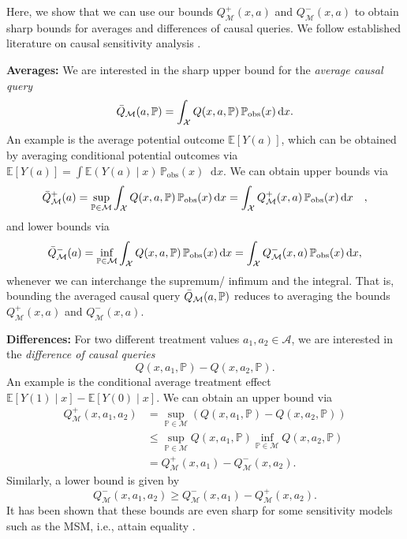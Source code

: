 \documentclass{article} %
\newcommand{\E}{\mathbb{E}}
\newcommand*\diff{\mathop{}\!\mathrm{d}}
\theoremstyle{definition}
\theoremstyle{plain}
\begin{document}
Here, we show that we can use our bounds $Q^+_\mathcal{M}(x, a)$ and $Q^-_\mathcal{M}(x, a)$ to obtain sharp bounds for averages and differences of causal queries. We follow established literature on causal sensitivity analysis \citep{Dorn.2022, Dorn.2022b, Frauen.2023c}.

\textbf{Averages:} We are interested in the sharp upper bound for the \emph{average causal query}
\begin{equation}
\Bar{Q}_\mathcal{M}(a, \mathbb{P}) = \int_\mathcal{X} Q(x, a, \mathbb{P}) \, \mathbb{P}_\mathrm{obs}(x) \diff x.
\end{equation}
An example is the average potential outcome $\E[Y(a)]$, which can be obtained by averaging conditional potential outcomes via $\E[Y(a)] = \int \E(Y(a) \mid x) \, \mathbb{P}_\mathrm{obs}(x) \diff x$. We can obtain upper bounds via
\begin{equation}\label{eq:bounds_avg}
\Bar{Q}^+_\mathcal{M}(a) = \sup_{\mathbb{P} \in \mathcal{M}} \int_\mathcal{X} Q(x, a, \mathbb{P}) \, \mathbb{P}_\mathrm{obs}(x) \diff x = \int_\mathcal{X} Q^+_\mathcal{M}(x, a) \, \mathbb{P}_\mathrm{obs}(x) \diff x\quad,
\end{equation}
and lower bounds via
\begin{equation}
 \Bar{Q}^-_\mathcal{M}(a) = \inf_{\mathbb{P} \in \mathcal{M}} \int_\mathcal{X} Q(x, a, \mathbb{P}) \, \mathbb{P}_\mathrm{obs}(x) \diff x  =  \int_\mathcal{X} Q^-_\mathcal{M}(x, a) \, \mathbb{P}_\mathrm{obs}(x) \diff x,
\end{equation}
whenever we can interchange the supremum/ infimum and the integral. That is, bounding the averaged causal query $\Bar{Q}_\mathcal{M}(a, \mathbb{P})$ reduces to averaging the bounds $Q^+_\mathcal{M}(x, a)$ and $Q^-_\mathcal{M}(x, a)$.

\textbf{Differences:} For two different treatment values $a_1, a_2 \in \mathcal{A}$, we are interested in the \emph{difference of causal queries}
\begin{equation}
    Q(x, a_1, \mathbb{P}) - Q(x, a_2, \mathbb{P}).
\end{equation}
An example is the conditional average treatment effect $\E[Y(1) \mid x] - \E[Y(0) \mid x]$. We can obtain an upper bound via
\begin{align}\label{eq:bounds_diff}
Q^+_\mathcal{M}(x, a_1, a_2) &=\sup_{\mathbb{P} \in \mathcal{M}} \left(  Q(x, a_1, \mathbb{P}) - Q(x, a_2, \mathbb{P}) \right) \\
& \leq \sup_{\mathbb{P} \in \mathcal{M}} Q(x, a_1, \mathbb{P})  \inf_{\mathbb{P} \in \mathcal{M}} Q(x, a_2, \mathbb{P}) \\
&= Q^+_\mathcal{M}(x, a_1)  - Q^-_\mathcal{M}(x, a_2).
\end{align}
Similarly, a lower bound is given by
\begin{equation}
Q^-_\mathcal{M}(x, a_1, a_2) \geq  Q^-_\mathcal{M}(x, a_1)  - Q^+_\mathcal{M}(x, a_2).
\end{equation}
It has been shown that these bounds are even sharp for some sensitivity models such as the MSM, i.e., attain equality \citep{Dorn.2022}.
\end{document}
